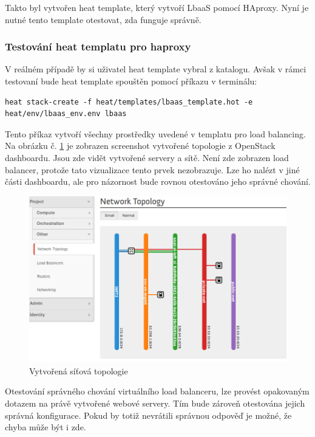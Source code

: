 Takto byl vytvořen heat template, který vytvoří LbaaS pomocí HAproxy. Nyní je nutné tento template otestovat, zda funguje správně.

\subsubsection{Testování heat templatu pro haproxy}

V reálném případě by si uživatel heat template vybral z katalogu. Avšak v rámci testovaní bude heat template spouštěn pomocí příkazu v terminálu:

\begin{lstlisting}
heat stack-create -f heat/templates/lbaas_template.hot -e heat/env/lbaas_env.env lbaas
\end{lstlisting}

Tento příkaz vytvoří všechny prostředky uvedené v templatu pro load balancing. Na obrázku č. \ref{fig:lbaas_topologie} je zobrazen screenshot vytvořené topologie z OpenStack dashboardu. Jsou zde vidět vytvořené servery a sítě. Není zde zobrazen load balancer, protože tato vizualizace tento prvek nezobrazuje. Lze ho nalézt v jiné části dashboardu, ale pro názornost bude rovnou otestováno jeho správné chování.

\begin{figure}[h]
\begin{centering}
\includegraphics[scale=0.45]{images/lbaas_topologie}
\par\end{centering}
\caption{Vytvořená síťová topologie\label{fig:lbaas_topologie}}
\end{figure}

Otestování správného chování virtuálního load balanceru, lze provést opakovaným dotazem na právě vytvořené webové servery. Tím bude zároveň otestována jejich správná konfigurace. Pokud by totiž nevrátili správnou odpověď je možné, že chyba může být i zde. 

